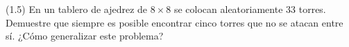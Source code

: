 (1.5) En un tablero de ajedrez de $8\times8$ se colocan aleatoriamente 33 torres. Demuestre que siempre es posible encontrar cinco torres que no se atacan entre sí. ¿Cómo generalizar este problema?

